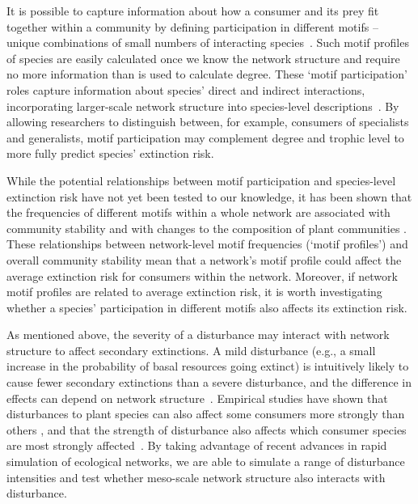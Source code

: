 \documentclass[12pt]{article}
\begin{document}
\begin{spacing}{2.0}
    It is possible to capture information about how a consumer and its prey fit together within a community by defining participation in different motifs -- unique combinations of small numbers of interacting species~\citep{Stouffer2007,Stouffer2012}. 
    Such motif profiles of species are easily calculated once we know the network structure and require no more information than is used to calculate degree.
    These `motif participation' roles capture information about species' direct and indirect interactions, incorporating larger-scale network structure into species-level descriptions~\citep{Cirtwill2015a,Cirtwill2018FoodWebs}. 
    By allowing researchers to distinguish between, for example, consumers of specialists and generalists, motif participation may complement degree and trophic level to more fully predict species' extinction risk. 
    

    While the potential relationships between motif participation and species-level extinction risk have not yet been tested to our knowledge, it has been shown that the frequencies of different motifs within a whole network are associated with community stability \citep{prill2005dynamic, bascompte2005simple} and with changes to the composition of plant communities \citep{giling2019plant}. 
    These relationships between network-level motif frequencies (`motif profiles') and overall community stability mean that a network's motif profile could affect the average extinction risk for consumers within the network.
    Moreover, if network motif profiles are related to average extinction risk, it is worth investigating whether a species' participation in different motifs also affects its extinction risk.


    As mentioned above, the severity of a disturbance may interact with network structure to affect secondary extinctions.
    A mild disturbance (e.g., a small increase in the probability of basal resources going extinct) is intuitively likely to cause fewer secondary extinctions than a severe disturbance, and the difference in effects can depend on network structure~\citep{Baumgartner2015}.
    Empirical studies have shown that disturbances to plant species can also affect some consumers more strongly than others  \citep{byrnes2011climate}, and that the strength of disturbance also affects which consumer species are most strongly affected~\citep{detmer2021variation,carnell2020more}. 
    By taking advantage of recent advances in rapid simulation of ecological networks, we are able to simulate a range of disturbance intensities and test whether meso-scale network structure also interacts with disturbance.
    



\end{spacing}
\end{document}
